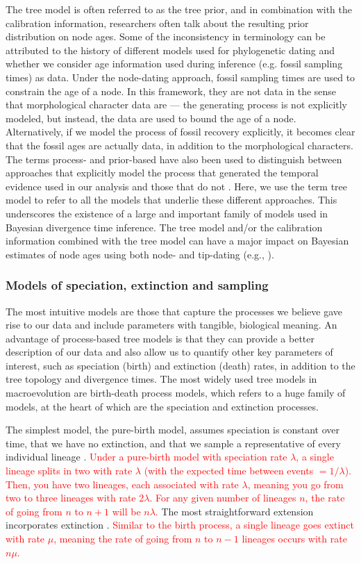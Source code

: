 \documentclass[11pt]{article}
\newcommand{\edit}[1]{{\textcolor{red}{#1}}} %
\begin{document}
The tree model is often referred to as the tree prior, and in combination with the calibration information, researchers often talk about the resulting prior distribution on node ages.
Some of the inconsistency in terminology can be attributed to the history of different models used for phylogenetic dating and whether we consider age information used during inference (e.g. fossil sampling times) as data.
Under the node-dating approach, fossil sampling times are used to constrain the age of a node.
In this framework, they are not data in the sense that morphological character data are --- the generating process is not explicitly modeled, but instead, the data are used to bound the age of a node.
Alternatively, if we model the process of fossil recovery explicitly, it becomes clear that the fossil ages are actually data, in addition to the morphological characters.
The terms process- and prior-based have also been used to distinguish between approaches that explicitly model the  process that generated the temporal evidence used in our analysis and those that do not \cite{Landis2016}. 
Here, we use the term tree model to refer to all the models that underlie these different approaches.
This underscores the existence of a large and important family of models used in Bayesian divergence time inference.
The tree model and/or the calibration information combined with the tree model can have a major impact on Bayesian estimates of node ages using both node- and tip-dating (e.g., \cite{Ho2009,Warnock2011,OReilly2015,matzke2016,Matschiner2017}).

\subsubsection{Models of speciation, extinction and sampling}

The most intuitive models are those that capture the processes we believe gave rise to our data and include parameters with tangible, biological meaning.
An advantage of process-based tree models is that they can provide a better description of our data and also allow us to quantify other key parameters of interest, such as speciation (birth) and extinction (death) rates, in addition to the tree topology and divergence times.
The most widely used tree models in macroevolution are birth-death process models, which refers to a huge family of models, at the heart of which are the speciation and extinction processes. 

The simplest model, the pure-birth model, assumes speciation is constant over time, that we have no extinction, and that we sample a representative of every individual lineage \cite{Yule1925}.
\edit{Under a pure-birth model with speciation rate $\lambda$, a single lineage splits in two with rate $\lambda$ (with the expected time between events $=1/\lambda$). Then, you have two lineages, each associated with rate $\lambda$, meaning you go from two to three lineages with rate 2$\lambda$. For any given number of lineages $n$, the rate of going from $n$ to $n+1$ will be $n\lambda$.}
The most straightforward extension incorporates  extinction \cite{Kendall1948}.
\edit{Similar to the birth process, a single lineage goes extinct with rate $\mu$, meaning the rate of going from $n$ to $n-1$ lineages occurs with rate $n\mu$.}
\end{document}
